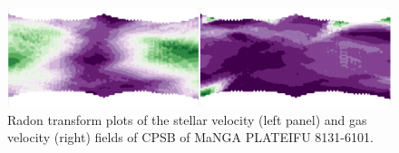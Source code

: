 \begin{figure}
    \centering
   	\includegraphics[width=\columnwidth]{images/RadonPlots/RT-snips/CPSB-8313-6101-RT-snip.png}
    \caption[Example of basic Radon transform plots for gas and velocity fields of CPSB 8131-6101]{Radon transform plots of the stellar velocity (left panel) and gas velocity (right) fields of CPSB of MaNGA PLATEIFU 8131-6101.}
    \label{fig:RT_8131-6101}
\end{figure}







